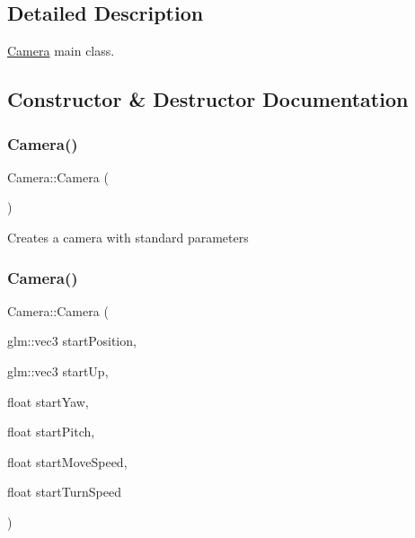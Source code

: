 \subsection{Detailed Description}
\mbox{\hyperlink{class_camera}{Camera}} main class. 

\subsection{Constructor \& Destructor Documentation}
\mbox{\label{class_camera_a01f94c3543f56ede7af49dc778f19331}} 
\subsubsection{\texorpdfstring{Camera()}{Camera()}\hspace{0.1cm}{\footnotesize\ttfamily [1/3]}}
{\footnotesize\ttfamily Camera\+::\+Camera (\begin{DoxyParamCaption}{ }\end{DoxyParamCaption})}

Creates a camera with standard parameters \mbox{\label{class_camera_a5fb61ac7fc737a2c72fb49420da383d0}} 
\subsubsection{\texorpdfstring{Camera()}{Camera()}\hspace{0.1cm}{\footnotesize\ttfamily [2/3]}}
{\footnotesize\ttfamily Camera\+::\+Camera (\begin{DoxyParamCaption}\item[{glm\+::vec3}]{start\+Position,  }\item[{glm\+::vec3}]{start\+Up,  }\item[{float}]{start\+Yaw,  }\item[{float}]{start\+Pitch,  }\item[{float}]{start\+Move\+Speed,  }\item[{float}]{start\+Turn\+Speed }\end{DoxyParamCaption})}


